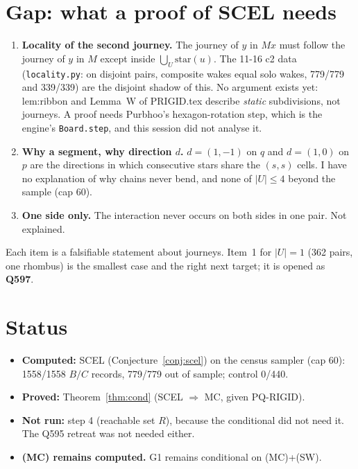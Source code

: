 \documentclass[11pt]{article}
\theoremstyle{definition}\newtheorem{definition}[theorem]{Definition}\newtheorem{remark}[theorem]{Remark}
\begin{document}
\section{Gap: what a proof of SCEL needs}\label{sec:gap}
\begin{enumerate}
\item \textbf{Locality of the second journey.} The journey of $y$ in $Mx$ must follow the journey of $y$ in $M$ except inside $\bigcup_U\mathrm{star}(u)$.
The 11-16 c2 data (\texttt{locality.py}: on disjoint pairs, composite wakes equal solo wakes, 779/779 and 339/339) are the disjoint shadow of this. No argument exists yet:
lem:ribbon and Lemma~W of PRIGID.tex describe \emph{static} subdivisions, not journeys. A proof needs Purbhoo's hexagon-rotation step, which is the engine's \texttt{Board.step},
and this session did not analyse it.
\item \textbf{Why a segment, why direction $d$.} $d=(1,-1)$ on $q$ and $d=(1,0)$ on $p$ are the directions in which consecutive stars share the $(s,s)$ cells.
I have no explanation of why chains never bend, and none of $|U|\le 4$ beyond the sample (cap 60).
\item \textbf{One side only.} The interaction never occurs on both sides in one pair. Not explained.
\end{enumerate}
Each item is a falsifiable statement about journeys. Item~1 for $|U|=1$ (362 pairs, one rhombus) is the smallest case and the right next target; it is opened as \textbf{Q597}.

\section{Status}
\begin{itemize}
\item \textbf{Computed:} SCEL (Conjecture~\ref{conj:scel}) on the census sampler (cap 60): 1558/1558 $B/C$ records, 779/779 out of sample; control 0/440.
\item \textbf{Proved:} Theorem~\ref{thm:cond} (SCEL $\Rightarrow$ MC, given PQ-RIGID).
\item \textbf{Not run:} step 4 (reachable set $R$), because the conditional did not need it. The Q595 retreat was not needed either.
\item \textbf{(MC) remains computed.} G1 remains conditional on (MC)+(SW).
\end{itemize}
\end{document}
